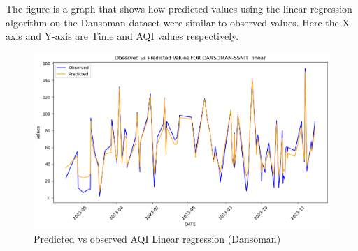 \documentclass{book}
\numberwithin{equation}{section}
\numberwithin{figure}{section}
\begin{document}
The figure is a graph that shows how predicted values using the linear regression algorithm on the Dansoman dataset were similar to observed values. Here the X-axis and Y-axis are Time and AQI values respectively.
\begin{figure}[H]
    \centering
        \includegraphics[width=\linewidth]{dansoman linear plot.png}
        \caption{ Predicted vs observed AQI Linear regression (Dansoman)}
         \label{fig: Linear Predicted vs observed(Dansoman)}
\end{figure}
\vspace{-5mm} %
\end{document}
